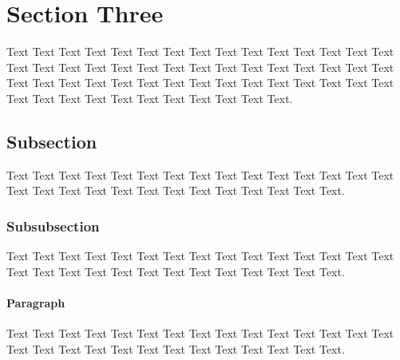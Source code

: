 \documentclass{article}
\begin{document}




\newpage


\section{Section Three}
\label{sec:section3}

%

Text Text Text Text Text Text Text Text Text Text Text Text Text Text 
Text Text Text Text Text Text Text Text Text Text Text Text Text Text 
Text Text Text Text Text Text Text Text Text Text Text Text Text Text 
Text Text Text Text Text Text Text Text Text Text Text Text Text Text. 


\subsection{Subsection}
\label{sec:subsection}

Text Text Text Text Text Text Text Text Text Text Text Text Text Text 
Text Text Text Text Text Text Text Text Text Text Text Text Text Text.


\subsubsection{Subsubsection}
\label{sec:subsection}

Text Text Text Text Text Text Text Text Text Text Text Text Text Text 
Text Text Text Text Text Text Text Text Text Text Text Text Text Text.


\paragraph*{Paragraph}

Text Text Text Text Text Text Text Text Text Text Text Text Text Text 
Text Text Text Text Text Text Text Text Text Text Text Text Text Text.
\end{document}
